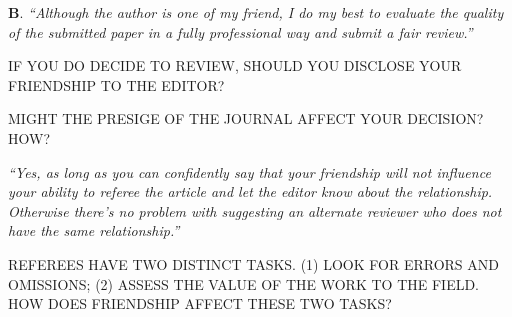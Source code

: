 \documentclass[portrait,11pt]{seminar}
\begin{document}
{\bf B}. {\it ``Although the author is one of my friend, I do my best to evaluate the quality of the submitted paper in a fully professional way and submit a fair review.''}

\medskip

IF YOU DO DECIDE TO REVIEW, SHOULD YOU DISCLOSE YOUR FRIENDSHIP TO THE EDITOR?

\medskip

MIGHT THE PRESIGE OF THE JOURNAL AFFECT YOUR DECISION? HOW?




\medskip




\es


\bs

{\it ``Yes, as long as you can confidently say that your friendship will not influence your ability to referee the article and let the editor know about the relationship. Otherwise there’s no problem with suggesting an alternate reviewer who does not have the same relationship.''}




\medskip

REFEREES HAVE TWO DISTINCT TASKS. (1) LOOK FOR ERRORS AND OMISSIONS; (2) ASSESS THE VALUE OF THE WORK TO THE FIELD. HOW DOES FRIENDSHIP AFFECT THESE TWO TASKS?

\es


\end{document}
